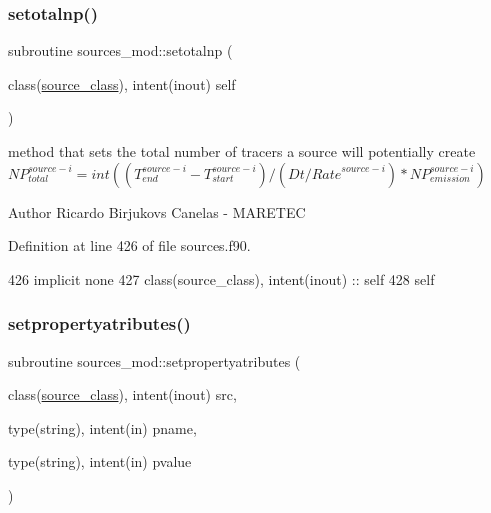 \subsubsection{\texorpdfstring{setotalnp()}{setotalnp()}}
{\footnotesize\ttfamily subroutine sources\+\_\+mod\+::setotalnp (\begin{DoxyParamCaption}\item[{class(\mbox{\hyperlink{structsources__mod_1_1source__class}{source\+\_\+class}}), intent(inout)}]{self }\end{DoxyParamCaption})\hspace{0.3cm}{\ttfamily [private]}}



method that sets the total number of tracers a source will potentially create ${NP}_{total}^{source-i}=int((T_{end}^{source-i}-T_{start}^{source-i})/(Dt/{Rate}^{source-i})*{NP}_{emission}^{source-i})$ 

\begin{DoxyAuthor}{Author}
Ricardo Birjukovs Canelas -\/ M\+A\+R\+E\+T\+EC 
\end{DoxyAuthor}


Definition at line 426 of file sources.\+f90.


\begin{DoxyCode}
426     \textcolor{keywordtype}{implicit none}
427     \textcolor{keywordtype}{class}(source\_class), \textcolor{keywordtype}{intent(inout)} :: self
428     self%
\end{DoxyCode}
\mbox{\label{namespacesources__mod_abbb4557b46c533439fe258cecf31a76c}} 
\subsubsection{\texorpdfstring{setpropertyatributes()}{setpropertyatributes()}}
{\footnotesize\ttfamily subroutine sources\+\_\+mod\+::setpropertyatributes (\begin{DoxyParamCaption}\item[{class(\mbox{\hyperlink{structsources__mod_1_1source__class}{source\+\_\+class}}), intent(inout)}]{src,  }\item[{type(string), intent(in)}]{pname,  }\item[{type(string), intent(in)}]{pvalue }\end{DoxyParamCaption})\hspace{0.3cm}{\ttfamily [private]}}



